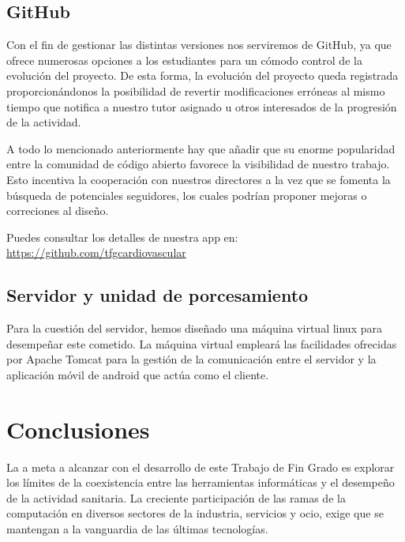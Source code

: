 \documentclass[11pt,spanish,
		listoftables,listoffigures]
		{tfgplantilla}
\begin{document}
\section {GitHub}

Con el fin de gestionar las distintas versiones nos serviremos de GitHub, ya que ofrece numerosas opciones a los estudiantes para un cómodo control de la evolución del proyecto. De esta forma, la evolución del proyecto queda registrada proporcionándonos la posibilidad de revertir modificaciones erróneas al mismo tiempo que notifica a nuestro tutor asignado u otros interesados de la progresión de la actividad. 

A todo lo mencionado anteriormente hay que añadir que su enorme popularidad entre la comunidad de código abierto favorece la visibilidad de nuestro trabajo. Esto incentiva la cooperación con nuestros directores a la vez que se fomenta la búsqueda de potenciales seguidores, los cuales podrían proponer mejoras o correciones al diseño.

\noindent Puedes consultar los detalles de nuestra app en: \url{https://github.com/tfgcardiovascular}

\section {Servidor y unidad de porcesamiento}

Para la cuestión del servidor, hemos diseñado una máquina virtual linux para desempeñar este cometido. La máquina virtual empleará las facilidades ofrecidas por Apache Tomcat para la gestión de la comunicación entre el servidor y la aplicación móvil de android que actúa como el cliente.



\chapter{Conclusiones}

La a meta a alcanzar con el desarrollo de este Trabajo de Fin Grado es explorar los límites de la coexistencia entre las herramientas informáticas y el desempeño de la actividad sanitaria. La creciente participación de las ramas de la computación en diversos sectores de la industria, servicios y ocio, exige que se mantengan a la vanguardia de las últimas tecnologías.
\end{document}
